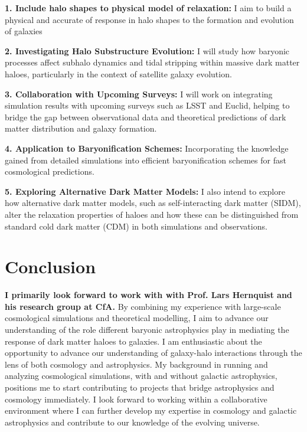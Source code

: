 \documentclass[10pt]{article}
\begin{document}
\textbf{1. Include halo shapes to physical model of relaxation:}  
I aim to build a physical and accurate of response in halo shapes to the formation and evolution of galaxies

\textbf{2. Investigating Halo Substructure Evolution:}  
I will study how baryonic processes affect subhalo dynamics and tidal stripping within massive dark matter haloes, particularly in the context of satellite galaxy evolution.

\textbf{3. Collaboration with Upcoming Surveys:}  
I will work on integrating simulation results with upcoming surveys such as LSST and Euclid, helping to bridge the gap between observational data and theoretical predictions of dark matter distribution and galaxy formation.

\textbf{4. Application to Baryonification Schemes:}  
Incorporating the knowledge gained from detailed simulations into efficient baryonification schemes for fast cosmological predictions.

\textbf{5. Exploring Alternative Dark Matter Models:}  
I also intend to explore how alternative dark matter models, such as self-interacting dark matter (SIDM), alter the relaxation properties of haloes and how these can be distinguished from standard cold dark matter (CDM) in both simulations and observations.

\section{Conclusion}
\textbf{I primarily look forward to work with with Prof. Lars Hernquist and his research group at CfA.} By combining my experience with large-scale cosmological simulations and theoretical modelling, I aim to advance our understanding of the role different baryonic astrophysics play in mediating the response of dark matter haloes to galaxies. I am enthusiastic about the opportunity to advance our understanding of galaxy-halo interactions through the lens of both cosmology and astrophysics. My background in running and analyzing cosmological simulations, with and without galactic astrophysics, positions me to start contributing to projects that bridge astrophysics and cosmology immediately. I look forward to working within a collaborative environment where I can further develop my expertise in cosmology and galactic astrophysics and contribute to our knowledge of the evolving universe.

\printbibliography
\end{document}
